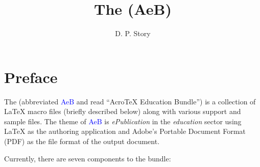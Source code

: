 \documentclass{article}
\title{\texorpdfstring{\LARGE The \AcroEB\space(AeB)}
    {The AcroTeX eDucation Bundle for LaTeX, Manual of Usage}}
\author{D. P. Story}
\def\AcroT{Acro\!\TeX}\def\cAcroT{\textcolor{blue}{\AcroT}}
\def\AEB{\textsf{AeB}}
\def\cAEB{\textcolor{blue}{\AEB}}
\begin{document}
\maketitle

\newpage


\tableofcontents


\part{Preface}


The {\cAcroEB} (abbreviated {\cAEB} and read ``{\AcroT} Education Bundle'') is a collection of {\LaTeX} macro files (briefly described below) along with various support and sample files.
The theme of {\cAEB} is \textit{ePublication} in the \textit{education} sector using {\LaTeX} as the authoring application and Adobe's Portable Document Format (\textsf{PDF}) as the file format of the output document.

\newtopic Currently, there are seven components to the bundle:
\end{document}
